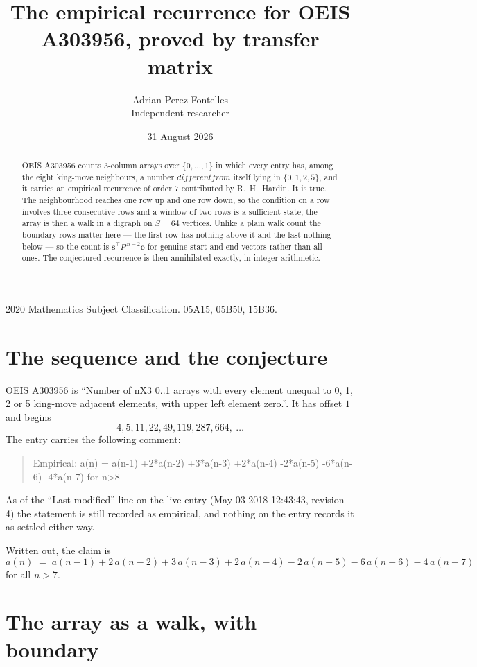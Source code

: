 \documentclass[11pt,a4paper]{article}
\title{The empirical recurrence for OEIS A303956, proved by transfer matrix}
\author{Adrian Perez Fontelles\\ \small Independent researcher}
\date{31 August 2026}
\theoremstyle{plain}
\theoremstyle{definition}
\begin{document}
\maketitle

\begin{abstract}
OEIS A303956 counts $3$-column arrays over $\{0,\dots,1\}$ in which every entry has,
among the eight king-move neighbours, a number $different from$ itself lying in $\{0,1,2,5\}$, and it carries an empirical
recurrence of order $7$ contributed by R.~H.~Hardin. It is true. The neighbourhood
reaches one row up and one row down, so the condition on a row involves three consecutive
rows and a window of two rows is a sufficient state; the array is then a walk in a digraph
on $S=64$ vertices. Unlike a plain walk count the boundary rows matter here --- the first
row has nothing above it and the last nothing below --- so the count is
$\mathbf{s}^{\!\top}P^{\,n-2}\mathbf{e}$ for genuine start and end vectors rather than
all-ones. The conjectured recurrence is then annihilated exactly, in integer arithmetic.
\end{abstract}

\noindent\small 2020 Mathematics Subject Classification. 05A15, 05B50, 15B36.\normalsize

\section{The sequence and the conjecture}

OEIS A303956 is ``Number of nX3 0..1 arrays with every element unequal to 0, 1, 2 or 5 king-move adjacent elements, with upper left element zero.''. It has offset
$1$ and begins
\[
4, 5, 11, 22, 49, 119, 287, 664,\ \dots
\]
The entry carries the following comment:
\begin{quote}\small
Empirical: a(n) = a(n-1) +2*a(n-2) +3*a(n-3) +2*a(n-4) -2*a(n-5) -6*a(n-6) -4*a(n-7) for n>8
\end{quote}
As of the ``Last modified'' line on the live entry (May 03 2018 12:43:43, revision
4) the statement is still recorded as empirical, and nothing on the entry
records it as settled either way.

Written out, the claim is
\begin{equation}\label{eq:conj}
a(n)\;=\;a(n-1) + 2\,a(n-2) + 3\,a(n-3) + 2\,a(n-4) - 2\,a(n-5) - 6\,a(n-6) - 4\,a(n-7)
\end{equation}
for all $n>7$.

\section{The array as a walk, with boundary}
\end{document}
